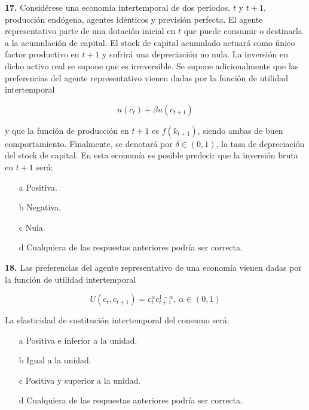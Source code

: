 \documentclass{nuevotema}
\begin{document}

\textbf{17.} Considérese una economía intertemporal de dos períodos, $t$ y $t+1$, producción endógena, agentes idénticos y previsión perfecta. El agente representativo parte de una dotación inicial en $t$ que puede consumir o destinarla a la acumulación de capital. El stock de capital acumulado actuará como único factor productivo en $t+1$ y sufrirá una depreciación no nula. La inversión en dicho activo real se supone que es irreversible. Se supone adicionalmente que las preferencias del agente representativo vienen dadas por la función de utilidad intertemporal

\begin{equation*}
    u(c_t) + \beta u(c_{t+1})
\end{equation*}

y que la función de producción en $t+1$ es $f(k_{t+1})$, siendo ambas de buen comportamiento. Finalmente, se denotará por $\delta \in (0,1)$, la tasa de depreciación del stock de capital. En esta economía es posible predecir que la inversión bruta en $t+1$ será:

\begin{enumerate}
    \item[a] Positiva.
    \item[b] Negativa.
    \item[c] Nula.
    \item[d] Cualquiera de las respuestas anteriores podría ser correcta.
\end{enumerate}

\textbf{18.} Las preferencias del agente representativo de una economía vienen dadas por la función de utilidad intertemporal

\begin{equation*}
    U(c_t, c_{t+1}) = c_t^\alpha c_{t+1}^{1-\alpha}, \, \alpha \in (0,1)
\end{equation*}

La elasticidad de sustitución intertemporal del consumo será:

\begin{enumerate}
    \item[a] Positiva e inferior a la unidad.
    \item[b] Igual a la unidad.
    \item[c] Positiva y superior a la unidad.
    \item[d] Cualquiera de las respuestas anteriores podría ser correcta.
\end{enumerate}
\end{document}
